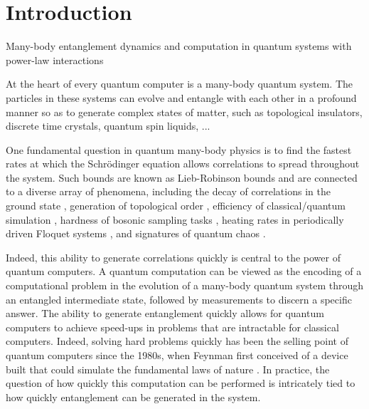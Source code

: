\chapter{Introduction}

Many-body entanglement dynamics and computation in quantum systems with power-law interactions

At the heart of every quantum computer is a many-body quantum system.
The particles in these systems can evolve and entangle with each other in a profound manner so as to generate complex states of matter, such as topological insulators, discrete time crystals, quantum spin liquids, ...

One fundamental question in quantum many-body physics is to find the fastest rates at which the  Schr\"odinger equation allows correlations to spread throughout the system.
Such bounds are known as Lieb-Robinson bounds and are connected to a diverse array of phenomena, including the decay of correlations in the ground state \cite{Hastings2006}, generation of topological order \cite{Bravyi2006, Bravyi2010}, efficiency of classical/quantum simulation \cite{Osborne2006,Tran2019a}, hardness of bosonic sampling tasks \cite{Deshpande2018}, heating rates in periodically driven Floquet systems \cite{Abanin2015,Tran2019b}, and signatures of quantum chaos \cite{Lashkari2013,Guo2019}.

Indeed, this ability to generate correlations quickly is central to the power of quantum computers.
A quantum computation can be viewed as the encoding of a computational problem in the evolution of a many-body quantum system through an entangled intermediate state, followed by measurements to discern a specific answer.
The ability to generate entanglement quickly allows for quantum computers to achieve speed-ups in problems that are intractable for classical computers.
Indeed, solving hard problems quickly has been the selling point of quantum computers since the 1980s, when Feynman first conceived of a device built that could simulate the fundamental laws of nature \cite{Feynman}.
In practice, the question of how quickly this computation can be performed is intricately tied to how quickly entanglement can be generated in the system.

